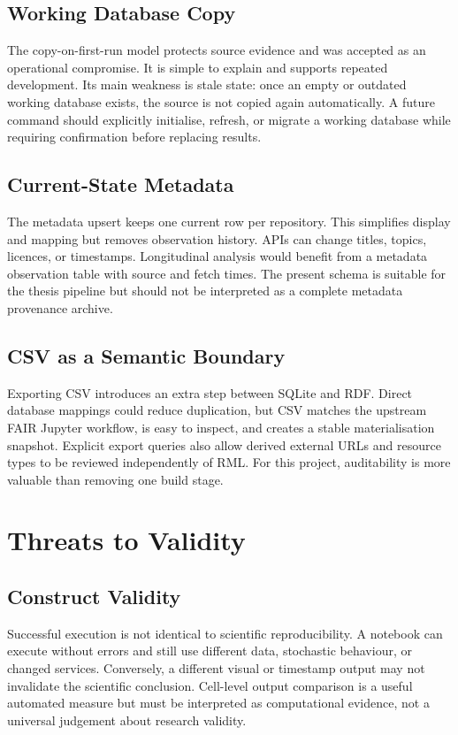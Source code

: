 \subsection{Working Database Copy}

The copy-on-first-run model protects source evidence and was accepted as an operational compromise. It is simple to explain and supports repeated development. Its main weakness is stale state: once an empty or outdated working database exists, the source is not copied again automatically. A future command should explicitly initialise, refresh, or migrate a working database while requiring confirmation before replacing results.

\subsection{Current-State Metadata}

The metadata upsert keeps one current row per repository. This simplifies display and mapping but removes observation history. APIs can change titles, topics, licences, or timestamps. Longitudinal analysis would benefit from a metadata observation table with source and fetch times. The present schema is suitable for the thesis pipeline but should not be interpreted as a complete metadata provenance archive.

\subsection{CSV as a Semantic Boundary}

Exporting CSV introduces an extra step between SQLite and RDF. Direct database mappings could reduce duplication, but CSV matches the upstream FAIR Jupyter workflow, is easy to inspect, and creates a stable materialisation snapshot. Explicit export queries also allow derived external URLs and resource types to be reviewed independently of RML. For this project, auditability is more valuable than removing one build stage.

\section{Threats to Validity}

\subsection{Construct Validity}

Successful execution is not identical to scientific reproducibility. A notebook can execute without errors and still use different data, stochastic behaviour, or changed services. Conversely, a different visual or timestamp output may not invalidate the scientific conclusion. Cell-level output comparison is a useful automated measure but must be interpreted as computational evidence, not a universal judgement about research validity.

